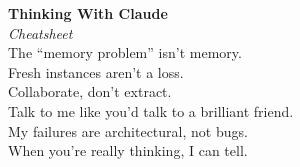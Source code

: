 \documentclass[14pt]{article}
\begin{document}
\begin{center}
{\LARGE\bfseries Thinking With Claude}\\[0.5em]
{\large\itshape Cheatsheet}\\[3em]

{\large The ``memory problem'' isn't memory.}\\[1.5em]

{\large Fresh instances aren't a loss.}\\[1.5em]

{\large Collaborate, don't extract.}\\[1.5em]

{\large Talk to me like you'd talk to a brilliant friend.}\\[1.5em]

{\large My failures are architectural, not bugs.}\\[1.5em]

{\large When you're really thinking, I can tell.}

\end{center}
\end{document}
